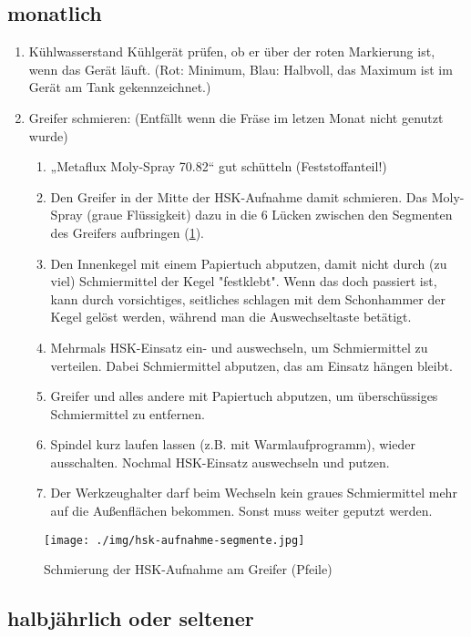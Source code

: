 \documentclass{\basedir/fablab-document}
\begin{document}
\subsection{monatlich}

\begin{enumerate}
	\item Kühlwasserstand Kühlgerät prüfen, ob er über der roten Markierung ist, wenn das Gerät läuft. (Rot: Minimum, Blau: Halbvoll, das Maximum ist im Gerät am Tank gekennzeichnet.)
	\item Greifer schmieren: (Entfällt wenn die Fräse im letzen Monat nicht genutzt wurde)
	\begin{enumerate}
        \item „Metaflux Moly-Spray 70.82“ gut schütteln (Feststoffanteil!)
        \item Den Greifer in der Mitte der HSK-Aufnahme damit schmieren. Das Moly-Spray (graue Flüssigkeit) dazu in die 6 Lücken zwischen den Segmenten des Greifers aufbringen (\cref{fig:hsk-greifer}). 
        \item Den Innenkegel mit einem Papiertuch abputzen, damit nicht durch (zu viel) Schmiermittel der Kegel "festklebt". Wenn das doch passiert ist, kann durch vorsichtiges, seitliches schlagen mit dem Schonhammer der Kegel gelöst werden, während man die Auswechseltaste betätigt.
        \item Mehrmals HSK-Einsatz ein- und auswechseln, um Schmiermittel zu verteilen. Dabei Schmiermittel abputzen, das am Einsatz hängen bleibt.
        \item Greifer und alles andere mit Papiertuch abputzen, um überschüssiges Schmiermittel zu entfernen.
        \item Spindel kurz laufen lassen (z.B. mit Warmlaufprogramm), wieder ausschalten. Nochmal HSK-Einsatz auswechseln und putzen.
        \item Der Werkzeughalter darf beim Wechseln kein graues Schmiermittel mehr auf die Außenflächen bekommen. Sonst muss weiter geputzt werden.
	\end{enumerate}
\end{enumerate}

\begin{figure}[ht!]
\centering
\texttt{[image: ./img/hsk-aufnahme-segmente.jpg]}
\caption{Schmierung der HSK-Aufnahme am Greifer (Pfeile)}
\label{fig:hsk-greifer}
\end{figure}

\subsection{halbjährlich oder seltener}
\end{document}

